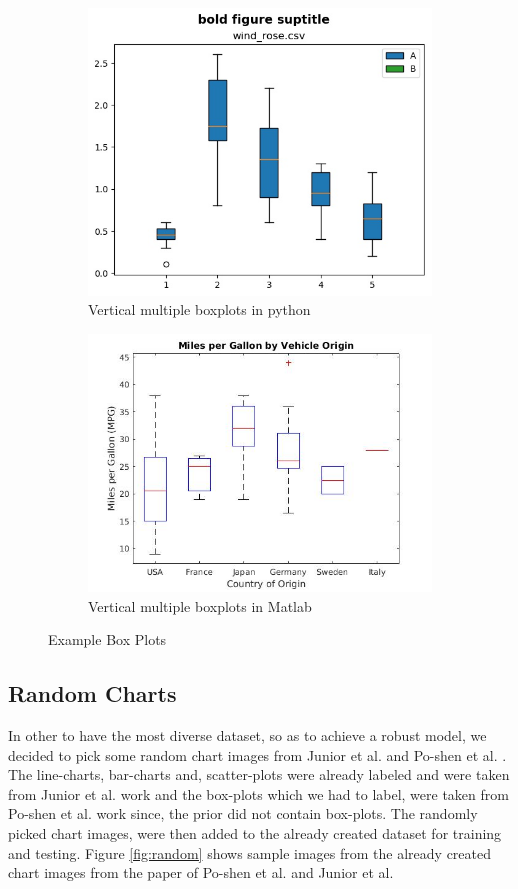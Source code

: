 \documentclass[12pt, a4paper,oneside]{report}
\begin{document}
\begin{figure}[!htbp]
	\begin{subfigure}{.5\textwidth}
		\centering
		\includegraphics[width=.8\linewidth]{box1}
		\caption{Vertical multiple boxplots in python}
		\label{fig:box1}
	\end{subfigure}%
	\begin{subfigure}{.5\textwidth}
		\centering
		\includegraphics[width=.8\linewidth]{box2}
		\caption{Vertical multiple boxplots in Matlab}
		\label{fig:box2}
	\end{subfigure}
	\caption{Example Box Plots}
	\label{fig:figbox}
\end{figure}


\subsection{Random Charts}
In other to have the most diverse dataset, so as to achieve a robust model, we decided to pick some random chart images from Junior et al. \cite{junior2017archi} and Po-shen et al. \cite{lee2016viziometrix}. The line-charts, bar-charts and, scatter-plots were already labeled and were taken from Junior et al. work and the box-plots which we had to label, were taken from Po-shen et al. work since, the prior did not contain box-plots. The randomly picked chart images, were then added to the already created dataset for training and testing. Figure \ref{fig:random} shows sample images from the already created chart images from the paper of Po-shen et al. and Junior et al.
\end{document}
